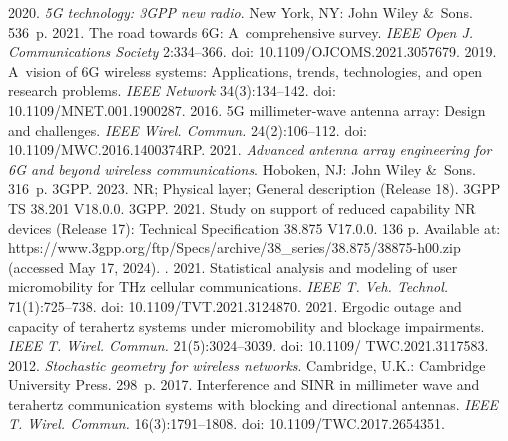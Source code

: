 \begin{multicols}{2}
{\small\frenchspacing
 {%
 \begin{thebibliography}{99} 
 2020. \textit{5G technology: 3GPP new radio}. 
New York, NY: John Wiley \&~Sons. 536~p.
 2021. The road towards 6G: 
A~comprehensive survey. \textit{IEEE Open J. Communications Society} 2:334--366. doi: 
10.1109/OJCOMS.2021.3057679.
 2019. A~vision of 6G wireless systems: Applications, 
trends, technologies, and open research problems. \textit{IEEE Network} 34(3):134--142. doi: 
10.1109/MNET.001.1900287.
 2016. 5G millimeter-wave antenna array: 
Design and challenges. \textit{IEEE Wirel. Commun.} 24(2):106--112. doi: 
10.1109/MWC.2016.1400374RP.
 2021. \textit{Advanced antenna array engineering for 6G 
and beyond wireless communications}. Hoboken, NJ: John Wiley \&~Sons. 316~p.
3GPP. 2023. NR; Physical layer; General description (Release 18). 3GPP TS 38.201 V18.0.0.  
3GPP. 2021. Study on support of reduced capability NR devices (Release 17): Technical Specification 
38.875 V17.0.0. 136 p. Available at: {\sf  
https://www.3gpp.org/ftp/\linebreak Specs/archive/38\_series/38.875/38875-h00.zip} (accessed May 17, 2024).
. 2021. 
Statistical analysis and modeling of user micromobility for THz cellular communications. \textit{IEEE 
T. Veh. Technol.} 71(1):725--738. doi: 10.1109/TVT.2021.3124870.
 2021. Ergodic outage and capacity of terahertz systems under micromobility and 
blockage impairments. \textit{IEEE T. Wirel. Commun.} 21(5):3024--3039. doi:  
10.1109/ TWC.2021.3117583.
 2012. \textit{Stochastic geometry for wireless networks}. Cambridge, U.K.: Cambridge 
University Press. 298~p.
 2017. 
Interference and SINR in millimeter wave and terahertz communication systems with blocking and 
directional antennas. \textit{IEEE T. Wirel. Commun.} 16(3):1791--1808. doi: 
10.1109/TWC.2017.2654351.


\end{thebibliography}}}
\end{multicols}

